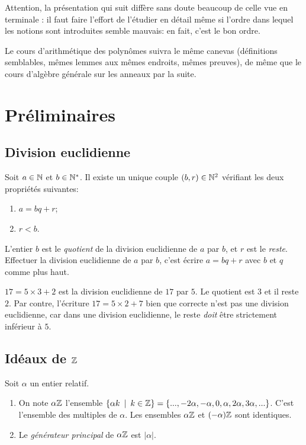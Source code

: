 
Attention, la présentation qui suit diffère sans doute beaucoup de celle vue en terminale : il faut faire l'effort de l'étudier en détail même si l'ordre dans lequel les notions sont introduites semble \og mauvais\fg : en fait, c'est le \og bon\fg{}  ordre.

Le cours d'arithmétique des polynômes suivra le même canevas (définitions semblables, mêmes lemmes aux mêmes endroits, mêmes preuves), de même que le cours d'algèbre générale sur les anneaux par la suite.

\section{Préliminaires}

\subsection{Division euclidienne}
\begin{proposition}
Soit $a\in \mathbb{N}$ et $b\in \mathbb{N}^*$. Il existe un unique couple $(b,r) \in \mathbb{N}^2$ vérifiant les deux propriétés suivantes:
\begin{enumerate}
\item $a=bq+r$;
\item $r < b$.
\end{enumerate}
L'entier $b$ est le \emph{quotient} de la division euclidienne de $a$ par $b$, et $r$ est le \emph{reste}.
Effectuer la division euclidienne de $a$ par $b$, c'est écrire $a = bq+r$ avec $b$ et $q$ comme plus haut.
\end{proposition}

\begin{exemple}
$17=5\times 3 + 2$ est la division euclidienne de $17$ par $5$. Le quotient est $3$ et il reste $2$. Par contre, l'écriture $17=5\times 2+7$ bien que correcte  n'est pas une division euclidienne, car dans une division euclidienne, le reste \emph{doit} être strictement inférieur à $5$.
\end{exemple}

\subsection{Idéaux de $\mathbb{Z}$}

\begin{definition}

Soit $\alpha$ un entier relatif.
\begin{enumerate}
\item On note $\alpha\mathbb{Z}$ l'ensemble $\{ \alpha k\:\mid\: k\in \mathbb{Z}\} = \{..., -2\alpha, -\alpha, 0, \alpha, 2\alpha, 3\alpha, ...\}$. C'est l'ensemble des multiples de $\alpha$. Les ensembles $\alpha\mathbb{Z}$ et $(-\alpha)\mathbb{Z}$ sont identiques.
\item Le \emph{générateur principal} de $\alpha\mathbb{Z}$ est $|\alpha|$.
\end{enumerate}
\end{definition}

